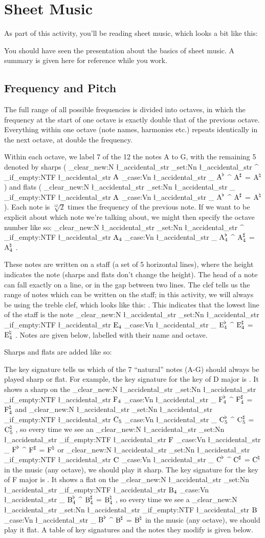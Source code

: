 \documentclass{article}
\newcommand{\notename}[3][]{
    \str_clear_new:N \l_accidental_str%
    \str_set:Nn \l_accidental_str {#1}%
    \str_if_empty:NTF \l_accidental_str {
        \ensuremath{\text{#2}\sb{#3}}%
    }{
        \str_case:Vn \l_accidental_str {%
            {_} {\ensuremath{\text{#2}^{\flat}\sb{#3}}}%
            {^} {\ensuremath{\text{#2}^{\sharp}\sb{#3}}}%
            {=} {\ensuremath{\text{#2}^{\natural}\sb{#3}}}%
        }
    }
}
\newcommand{\important}[1]{{\color{Accent1}#1}}
\begin{document}
\ifinstructor
\clearpage
\fi

\section{Sheet Music}

As part of this activity, you'll be reading sheet music, which looks a bit like this:



You should have seen the presentation about the basics of sheet music. A summary is given here for reference while you work.

\subsection{Frequency and Pitch}

The full range of all possible frequencies is divided into \important{octaves}, in which the frequency at the start of one octave is exactly double that of the previous octave. Everything within one octave (note names, harmonies etc.) repeats identically in the next octave, at double the frequency.

Within each octave, we label 7 of the 12 the notes A to G, with the remaining 5 denoted by \important{sharps} (\notename[^]{A}{}) and \important{flats} (\notename[_]{A}{}). Each note is $\sqrt[12]{2}$ times the frequency of the previous note. If we want to be explicit about which note we're talking about, we might then specify the octave number like so: \notename[^]{A}{4}. 

These notes are written on a \important{staff} (a set of 5 horizontal lines), where the height indicates the note (sharps and flats don't change the height). The head of a note can fall exactly on a line, or in the gap between two lines. The \important{clef} tells us the range of notes which can be written on the staff; in this activity, we will always be using the treble clef, which looks like this: \resizebox{0.65\baselineskip}{!}{}. This indicates that the lowest line of the staff is the note \notename{E}{4}. Notes are given below, labelled with their name and octave.



Sharps and flats are added like so: \raisebox{-0.35\height}{}

The \important{key signature} tells us which of the 7 ``natural'' notes (A-G) should always be played sharp or flat. For example, the key signature for the key of D major is \raisebox{-0.35\height}{\resizebox{!}{3\baselineskip}{}}. It shows a sharp on the \notename{F}{4} and \notename{C}{5}, so every time we see an \notename{F}{} or \notename{C}{} in the music (any octave), we should play it sharp. The key signature for the key of F major is \raisebox{-0.35\height}{\resizebox{!}{3\baselineskip}{}}. It shows a flat on the \notename{B}{4}, so every time we see a \notename{B}{} in the music (any octave), we should play it flat. A table of key signatures and the notes they modify is given below.
\end{document}
